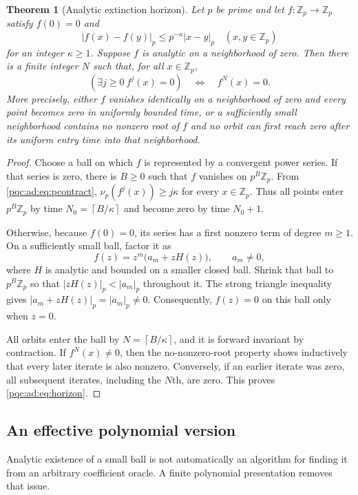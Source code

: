 \documentclass[11pt,letterpaper]{article}
\numberwithin{equation}{section}
\newtheorem{theorem}{Theorem}[section]
\theoremstyle{definition}
\theoremstyle{remark}
\newcommand{\ceil}[1]{\left\lceil #1\right\rceil}
\newcommand{\Zp}{\mathbb Z_p}
\begin{document}
\begin{theorem}[Analytic extinction horizon]\label{pqc:ad:thm:analytic}
Let $p$ be prime and let $f\colon\Zp\to\Zp$ satisfy $f(0)=0$ and
\begin{equation}\label{pqc:ad:eq:pcontract}
|f(x)-f(y)|_p\le p^{-\kappa}|x-y|_p
\quad(x,y\in\Zp)
\end{equation}
for an integer $\kappa\ge1$. Suppose $f$ is analytic on a neighborhood of
zero. Then there is a finite integer $N$ such that, for all $x\in\Zp$,
\begin{equation}\label{pqc:ad:eq:horizon}
(\exists j\ge0\ f^j(x)=0)\quad\Longleftrightarrow\quad f^N(x)=0.
\end{equation}
More precisely, either $f$ vanishes identically on a neighborhood of zero
and every point becomes zero in uniformly bounded time, or a sufficiently
small neighborhood contains no nonzero root of $f$ and no orbit can first
reach zero after its uniform entry time into that neighborhood.
\end{theorem}
\begin{proof}
Choose a ball on which $f$ is represented by a convergent power series.
If that series is zero, there is $B\ge0$ such that $f$ vanishes on
$p^B\Zp$. From \eqref{pqc:ad:eq:pcontract},
$\nu_p(f^j(x))\ge j\kappa$ for every $x\in\Zp$. Thus all points enter
$p^B\Zp$ by time $N_0=\ceil{B/\kappa}$ and become zero by time $N_0+1$.

Otherwise, because $f(0)=0$, its series has a first nonzero term of degree
$m\ge1$. On a sufficiently small ball, factor it as
\[
f(z)=z^m\bigl(a_m+zH(z)\bigr),\qquad a_m\ne0,
\]
where $H$ is analytic and bounded on a smaller closed ball. Shrink that
ball to $p^B\Zp$ so that $|zH(z)|_p<|a_m|_p$ throughout it. The strong
triangle inequality gives
$|a_m+zH(z)|_p=|a_m|_p\ne0$. Consequently, $f(z)=0$ on this ball only when
$z=0$.

All orbits enter the ball by $N=\ceil{B/\kappa}$, and it is forward
invariant by contraction. If $f^N(x)\ne0$, then the no-nonzero-root property
shows inductively that every later iterate is also nonzero. Conversely,
if an earlier iterate was zero, all subsequent iterates, including the
$N$th, are zero. This proves \eqref{pqc:ad:eq:horizon}.
\end{proof}

\subsection{An effective polynomial version}
Analytic existence of a small ball is not automatically an algorithm for
finding it from an arbitrary coefficient oracle. A finite polynomial
presentation removes that issue.
\end{document}
